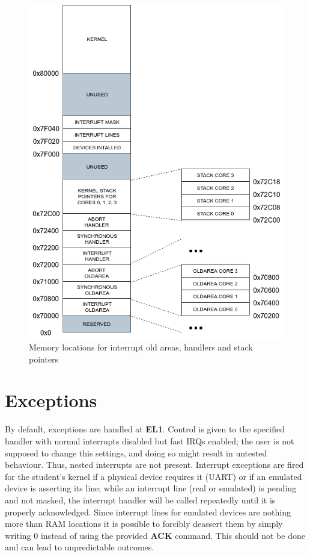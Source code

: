 \documentclass[12pt,a4paper,openright,twoside]{report}
\begin{document}
 \begin{figure}[h]
    \begin{center}
 \includegraphics[scale=0.55]{images/tesi14.png}
 \caption[Memory Map]{Memory locations for interrupt old areas, handlers 
 and stack pointers}\label{fig:memmap}
    \end{center}
 \end{figure}

 \newpage

\section{Exceptions}
By default, exceptions are handled at \textbf{EL1}. Control is given to the 
specified handler with normal interrupts disabled but fast IRQs enabled; the user
is not supposed to change this settings, and doing so might result in untested
behaviour.
Thus, nested interrupts are not present. Interrupt exceptions are fired
for the student's kernel if a physical device requires it (UART) or if an 
emulated device is asserting its line; while an interrupt line (real or 
emulated) is pending and not masked, the interrupt handler will be called repeatedly
until it is properly acknowledged.
Since interrupt lines for emulated devices are nothing more than RAM locations
it is possible to forcibly deassert them by simply writing 0 instead of using
the provided \textbf{ACK} command. This should not be done and can lead to 
unpredictable outcomes.
\end{document}
